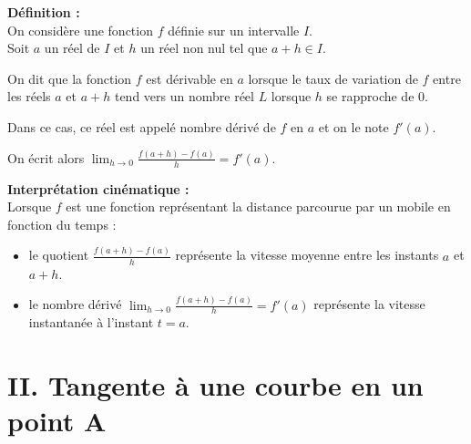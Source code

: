 \documentclass[11pt,a4paper]{article}
\begin{document}
\begin{mdframed}[style=definitionStyle]
    \textbf{Définition :} ~\\
    On considère une fonction $f$ définie sur un intervalle $I$. \\
    Soit $a$ un réel de $I$ et $h$ un réel non nul tel que $a+h\in I$.

    On dit que la fonction $f$ est dérivable en $a$ lorsque le taux de variation de $f$ entre les réels $a$ et $a+h$ tend vers un nombre réel $L$ lorsque $h$ se rapproche de $0$.

    Dans ce cas, ce réel est appelé nombre dérivé de $f$ en $a$ et on le note $f'(a)$.

    On écrit alors $\displaystyle{\lim_{h\to0}%
            \frac{f(a+h)-f(a)}{h}}=f'(a)$.
\end{mdframed}

\textbf{Interprétation cinématique :} \\
Lorsque $f$ est une fonction représentant la distance parcourue par un mobile en fonction du temps :
\begin{itemize}
    \item le quotient $\frac{f(a+h)-f(a)}{h}$ représente la vitesse moyenne entre les instants $a$ et $a+h$.
    \item le nombre dérivé ${\lim_{h\to0}\frac{f(a+h)-f(a)}{h}}=f'(a)$ représente la vitesse instantanée à l'instant $t=a$.
\end{itemize}

\newpage

\section*{II. Tangente à une courbe en un point $\boldsymbol{A}$}
\end{document}
